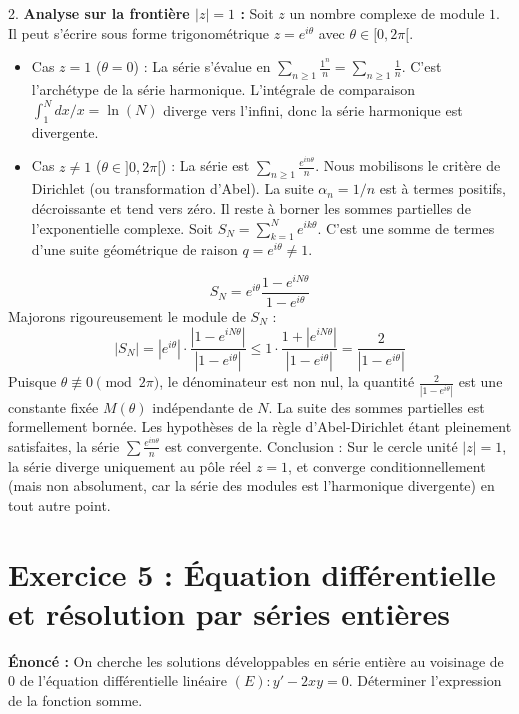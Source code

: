 \documentclass{report}
\begin{document}
2. \textbf{Analyse sur la frontière $|z| = 1$ :}
Soit $z$ un nombre complexe de module $1$. Il peut s'écrire sous forme trigonométrique $z = e^{i\theta}$ avec $\theta \in [0, 2\pi[$.
\begin{itemize}
\item Cas $z = 1$ ($\theta = 0$) : La série s'évalue en $\sum_{n \geq 1} \frac{1^n}{n} = \sum_{n \geq 1} \frac{1}{n}$. C'est l'archétype de la série harmonique. L'intégrale de comparaison $\int_{1}^{N} dx/x = \ln(N)$ diverge vers l'infini, donc la série harmonique est divergente.
\item Cas $z \neq 1$ ($\theta \in ]0, 2\pi[$) : La série est $\sum_{n \geq 1} \frac{e^{in\theta}}{n}$.
Nous mobilisons le critère de Dirichlet (ou transformation d'Abel). La suite $\alpha_n = 1/n$ est à termes positifs, décroissante et tend vers zéro.
Il reste à borner les sommes partielles de l'exponentielle complexe. Soit $S_N = \sum_{k=1}^N e^{ik\theta}$. C'est une somme de termes d'une suite géométrique de raison $q = e^{i\theta} \neq 1$.
\end{itemize}
$$ S_N = e^{i\theta} \frac{1 - e^{iN\theta}}{1 - e^{i\theta}} $$
Majorons rigoureusement le module de $S_N$ :
$$ |S_N| = \left| e^{i\theta} \right| \cdot \frac{\left| 1 - e^{iN\theta} \right|}{\left| 1 - e^{i\theta} \right|} \leq 1 \cdot \frac{1 + \left| e^{iN\theta} \right|}{\left| 1 - e^{i\theta} \right|} = \frac{2}{\left| 1 - e^{i\theta} \right|} $$
Puisque $\theta \not\equiv 0 \pmod{2\pi}$, le dénominateur est non nul, la quantité $\frac{2}{|1 - e^{i\theta}|}$ est une constante fixée $M(\theta)$ indépendante de $N$. La suite des sommes partielles est formellement bornée.
Les hypothèses de la règle d'Abel-Dirichlet étant pleinement satisfaites, la série $\sum \frac{e^{in\theta}}{n}$ est convergente.
Conclusion : Sur le cercle unité $|z|=1$, la série diverge uniquement au pôle réel $z=1$, et converge conditionnellement (mais non absolument, car la série des modules est l'harmonique divergente) en tout autre point.

\newpage
\chapter*{Exercice 5 : Équation différentielle et résolution par séries entières}

\textbf{Énoncé :}
On cherche les solutions développables en série entière au voisinage de $0$ de l'équation différentielle linéaire $(E) : y' - 2xy = 0$. Déterminer l'expression de la fonction somme.
\end{document}
